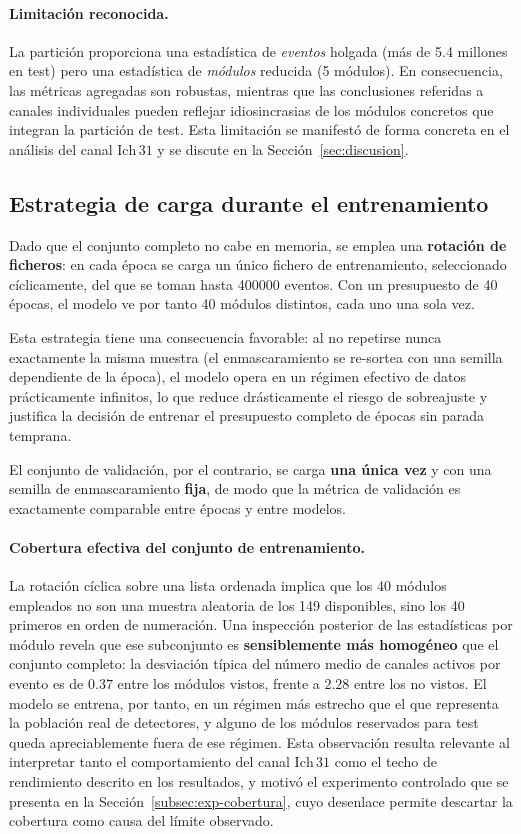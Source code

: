 \paragraph{Limitación reconocida.} La partición proporciona una estadística de \emph{eventos}
holgada (más de 5.4 millones en test) pero una estadística de \emph{módulos} reducida (5 módulos).
En consecuencia, las métricas agregadas son robustas, mientras que las conclusiones referidas a
canales individuales pueden reflejar idiosincrasias de los módulos concretos que integran la
partición de test. Esta limitación se manifestó de forma concreta en el análisis del canal
$\mathrm{Ich}\,31$ y se discute en la Sección~\ref{sec:discusion}.

\subsection{Estrategia de carga durante el entrenamiento}
\label{subsec:carga-entrenamiento}

Dado que el conjunto completo no cabe en memoria, se emplea una \textbf{rotación de ficheros}: en
cada época se carga un único fichero de entrenamiento, seleccionado cíclicamente, del que se toman
hasta \num{400000} eventos. Con un presupuesto de 40 épocas, el modelo ve por tanto 40 módulos
distintos, cada uno una sola vez.

Esta estrategia tiene una consecuencia favorable: al no repetirse nunca exactamente la misma muestra
(el enmascaramiento se re-sortea con una semilla dependiente de la época), el modelo opera en un
régimen efectivo de datos prácticamente infinitos, lo que reduce drásticamente el riesgo de
sobreajuste y justifica la decisión de entrenar el presupuesto completo de épocas sin parada
temprana.

El conjunto de validación, por el contrario, se carga \textbf{una única vez} y con una semilla de
enmascaramiento \textbf{fija}, de modo que la métrica de validación es exactamente comparable entre
épocas y entre modelos.

\paragraph{Cobertura efectiva del conjunto de entrenamiento.} La rotación cíclica sobre una lista
ordenada implica que los 40 módulos empleados no son una muestra aleatoria de los 149 disponibles,
sino los 40 primeros en orden de numeración. Una inspección posterior de las estadísticas por módulo
revela que ese subconjunto es \textbf{sensiblemente más homogéneo} que el conjunto completo: la
desviación típica del número medio de canales activos por evento es de $0.37$ entre los módulos
vistos, frente a $2.28$ entre los no vistos. El modelo se entrena, por tanto, en un régimen más
estrecho que el que representa la población real de detectores, y alguno de los módulos reservados
para test queda apreciablemente fuera de ese régimen. Esta observación resulta relevante al
interpretar tanto el comportamiento del canal $\mathrm{Ich}\,31$ como el techo de rendimiento
descrito en los resultados, y motivó el experimento controlado que se presenta en la
Sección~\ref{subsec:exp-cobertura}, cuyo desenlace permite descartar la cobertura como causa del
límite observado.


